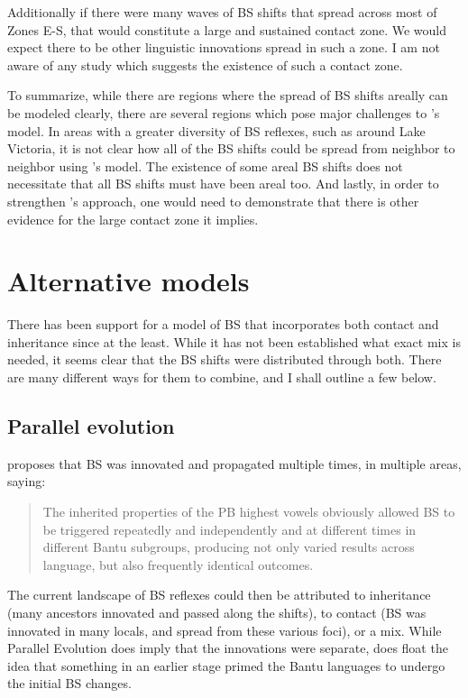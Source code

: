 \documentclass[output=paper,colorlinks,citecolor=brown
]{langscibook}
\begin{document}
Additionally if there were many waves of BS shifts that spread across most of Zones E-S, that would constitute a large and sustained contact zone. We would expect there to be other linguistic innovations spread in such a zone. I am not aware of any study which suggests the existence of such a contact zone.

To summarize, while there are regions where the spread of BS shifts areally can be modeled clearly, there are several regions which pose major challenges to \citeauthor{Janson2007}’s model. In areas with a greater diversity of BS reflexes, such as around Lake Victoria, it is not clear how all of the BS shifts could be spread from neighbor to neighbor using \citeauthor{Janson2007}’s model. The existence of some areal BS shifts does not necessitate that all BS shifts must have been areal too. And lastly, in order to strengthen \citeauthor{Janson2007}’s approach, one would need to demonstrate that there is other evidence for the large contact zone it implies.

\section{Alternative models}

There has been support for a model of BS that incorporates both contact and inheritance since \citet{hinnebusch1981} at the least. While it has not been established what exact mix is needed, it seems clear that the BS shifts were distributed through both. There are many different ways for them to combine, and I shall outline a few below.

\subsection{Parallel evolution}

\citet[309]{bostoen2008} proposes that BS was innovated and propagated multiple times, in multiple areas, saying:
\begin{quote}
    The inherited properties of the PB highest vowels obviously allowed BS to be triggered repeatedly and independently and at different times in different Bantu subgroups, producing not only varied results across language, but also frequently identical outcomes.
\end{quote}
The current landscape of BS reflexes could then be attributed to inheritance (many ancestors innovated and passed along the shifts), to contact (BS was innovated in many locals, and spread from these various foci), or a mix. While Parallel Evolution does imply that the innovations were separate, \citeauthor{bostoen2008} does float the idea that something in an earlier stage primed the Bantu languages to undergo the initial BS changes.
\end{document}
